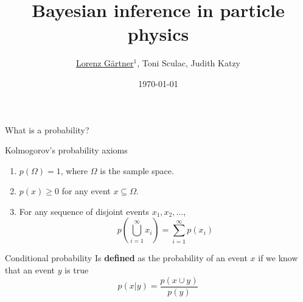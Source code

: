\documentclass[
aspectratio=169,
14pt,
professionalfonts
]{beamer}
\title[]{Bayesian inference in particle physics}
\author[L. G\"artner]{\underline{Lorenz G\"artner}$^{1}$, Toni Sculac, Judith Katzy }
\institute[LMU]{$^1$LMU Munich}
\date{\today}
\begin{document}
\begin{frame}[titleslide]
    \titlepage
\end{frame}

\begin{frame}

\centering
\Large
What is a probability?
    
\end{frame}

\begin{frame}{Kolmogorov's probability axioms}
\begin{enumerate}
  \item $ p(\Omega) = 1 $, where \( \Omega \) is the sample space.
  \item $ p(x) \geq 0 $ for any event \( x \subseteq \Omega \).
  \item For any sequence of disjoint events \( x_1, x_2, \dots \), 
        $$
        p\left( \bigcup_{i=1}^{\infty} x_i \right) = \sum_{i=1}^{\infty} p(x_i)
        $$
\end{enumerate}
\end{frame}


\begin{frame}{Conditional probability}
Is \textbf{defined} as the probability of an event $x$ if we know that an event $y$ is true
$$p(x|y) = \frac{p(x \cup y)}{p(y)}$$
\end{frame}
\end{document}

